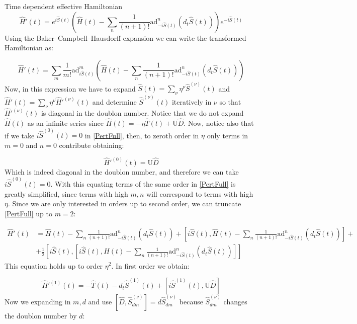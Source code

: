 \begin{section}{Time dependent effective Hamiltonian}
\begin{equation}
\hat{H}'(t) = e^{i\hat{S}(t)} \left( \hat{H}(t) - \sum_n \frac{1}{(n+1)!}\text{ad}_{-i\hat{S}(t)}^n (d_t \hat{S}(t)) \right) e^{-i\hat{S}(t)}
\end{equation}
Using the Baker–Campbell–Hausdorff expansion we can write the transformed Hamiltonian as:

\begin{equation}
\label{PertFull}
\hat{H}'(t) = \sum_m \frac{1}{m!} \text{ad}_{i\hat{S}(t)}^m \left( \hat{H}(t) - \sum_n \frac{1}{(n+1)!}\text{ad}_{-i\hat{S}(t)}^n (d_t \hat{S}(t)) \right)
\end{equation}
Now, in this expression we have to expand $\hat{S}(t) = \sum_\nu \eta^\nu \hat{S}^{(\nu)}(t)$ and $\hat{H}'(t) = \sum_\nu \eta^\nu \hat{H}'^{(\nu)}(t)$ and determine $\hat{S}^{(\nu)}(t)$ iteratively in $\nu$ so that $\hat{H}'^{(\nu)}(t)$ is diagonal in the doublon number. Notice that we do not expand $\hat{H}(t)$ as an infinite series since $\hat{H}(t) = -\eta \hat{T}(t) + \text{U}\hat{D}$. Now, notice also that if we take $i\hat{S}^{(0)}(t)=0$ in \ref{PertFull}, then, to zeroth order in $\eta$ only terms in $m=0$ and $n=0$ contribute obtaining:

\begin{equation}
\hat{H}'^{(0)}(t) = \text{U}\hat{D}
\end{equation}
Which is indeed diagonal in the doublon number, and therefore we can take $i\hat{S}^{(0)}(t)=0$. With this equating terms of the same order in \ref{PertFull} is greatly simplified, since terms with high $m,n$ will correspond to terms with high $\eta$. Since we are only interested in orders up to second order, we can truncate \ref{PertFull} up to $m=2$:

\begin{align}
\label{PertTrunc}
\hat{H}'(t) &=  \hat{H}(t) - \sum_n \frac{1}{(n+1)!}\text{ad}_{-i\hat{S}(t)}^n (d_t \hat{S}(t)) + [i\hat{S}(t), \hat{H}(t) - \sum_n \frac{1}{(n+1)!}\text{ad}_{-i\hat{S}(t)}^n (d_t \hat{S}(t))] + \nonumber \\
&+ \frac{1}{2} [i\hat{S}(t),[i\hat{S}(t), \hat{H}(t) - \sum_n \frac{1}{(n+1)!}\text{ad}_{-i\hat{S}(t)}^n (d_t \hat{S}(t)) ]]
\end{align}
This equation holds up to order $\eta^2$. In first order we obtain:

\begin{equation}
\label{1stO}
\hat{H}'^{(1)}(t) = -\hat{T}(t) - d_t\hat{S}^{(1)}(t) + \left[ i\hat{S}^{(1)}(t), \text{U}\hat{D} \right]
\end{equation}
Now we expanding in $m,d$ and use $\left[ \hat{D}, \hat{S}^{(\nu)}_{dm} \right] = d\hat{S}^{(\nu)}_{dm}$ because $\hat{S}^{(\nu)}_{dm}$ changes the doublon number by $d$:


\end{section}
